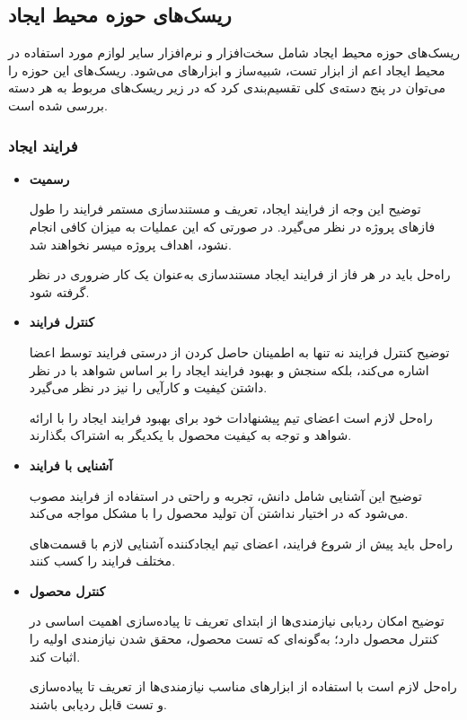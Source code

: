 \subsection{ریسک‌های حوزه محیط ایجاد}

ریسک‌های حوزه محیط ایجاد شامل سخت‌افزار و نرم‌افزار سایر لوازم مورد استفاده در محیط ایجاد اعم از ابزار تست، شبیه‌ساز و ابزارهای  می‌شود. ریسک‌های این حوزه را می‌توان در پنج دسته‌ی کلی تقسیم‌بندی کرد که در زیر ریسک‌های مربوط به هر دسته بررسی شده است.

\subsubsection{فرایند ایجاد}

\begin{itemize}
	
	\item 
	\textbf{رسمیت}

	توضیح \hspace*{1cm} 
این وجه از فرایند ایجاد، تعریف و مستندسازی مستمر فرایند را طول فازهای پروژه در نظر می‌گیرد. در صورتی که این عملیات به میزان کافی انجام نشود، اهداف پروژه میسر نخواهند شد.
	
	راه‌حل \hspace*{1cm} 
باید در هر فاز از فرایند ایجاد مستندسازی به‌عنوان یک کار ضروری در نظر گرفته شود.
		
	\item 
	\textbf{کنترل فرایند}

	توضیح \hspace*{1cm} 
کنترل فرایند نه تنها به اطمینان حاصل کردن از درستی فرایند توسط اعضا اشاره می‌کند، بلکه سنجش و بهبود فرایند ایجاد را بر اساس شواهد با در نظر داشتن کیفیت و کارآیی را نیز در نظر می‌گیرد.
	
	راه‌حل \hspace*{1cm} 
لازم است اعضای تیم پیشنهادات خود برای بهبود فرایند ایجاد را با ارائه شواهد و توجه به کیفیت محصول با یکدیگر به اشتراک بگذارند.
		
	\item 
	\textbf{آشنایی با فرایند}

	توضیح \hspace*{1cm} 
این آشنایی شامل دانش، تجربه و راحتی در استفاده از فرایند مصوب می‌شود که در اختیار نداشتن آن تولید محصول را با مشکل مواجه می‌کند.
	
	راه‌حل \hspace*{1cm} 
باید پیش از شروع فرایند، اعضای تیم ایجادکننده آشنایی لازم با قسمت‌های مختلف فرایند را کسب کنند.
		
	\item 
	\textbf{کنترل محصول}

	توضیح \hspace*{1cm} 
امکان ردیابی نیازمندی‌ها از ابتدای تعریف تا پیاده‌سازی اهمیت اساسی در کنترل محصول دارد؛ به‌گونه‌ای که تست محصول، محقق شدن نیازمندی اولیه را اثبات کند.
	
	راه‌حل \hspace*{1cm} 
لازم است با استفاده از ابزارهای مناسب نیازمندی‌ها از تعریف تا پیاده‌سازی و تست قابل ردیابی باشند.
		
\end{itemize}

